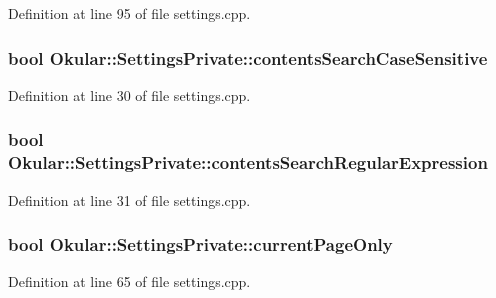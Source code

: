 Definition at line 95 of file settings.\+cpp.

\hypertarget{classOkular_1_1SettingsPrivate_ae9050bcbbf06beab63c6a46fe7e9273b}{
\subsubsection[{contents\+Search\+Case\+Sensitive}]{\setlength{\rightskip}{0pt plus 5cm}bool Okular\+::\+Settings\+Private\+::contents\+Search\+Case\+Sensitive}}\label{classOkular_1_1SettingsPrivate_ae9050bcbbf06beab63c6a46fe7e9273b}


Definition at line 30 of file settings.\+cpp.

\hypertarget{classOkular_1_1SettingsPrivate_a40bd9f8a34c27f1fdd6b215fda767d44}{
\subsubsection[{contents\+Search\+Regular\+Expression}]{\setlength{\rightskip}{0pt plus 5cm}bool Okular\+::\+Settings\+Private\+::contents\+Search\+Regular\+Expression}}\label{classOkular_1_1SettingsPrivate_a40bd9f8a34c27f1fdd6b215fda767d44}


Definition at line 31 of file settings.\+cpp.

\hypertarget{classOkular_1_1SettingsPrivate_af179ccdc3a2baac363aafae958493a8d}{
\subsubsection[{current\+Page\+Only}]{\setlength{\rightskip}{0pt plus 5cm}bool Okular\+::\+Settings\+Private\+::current\+Page\+Only}}\label{classOkular_1_1SettingsPrivate_af179ccdc3a2baac363aafae958493a8d}


Definition at line 65 of file settings.\+cpp.

